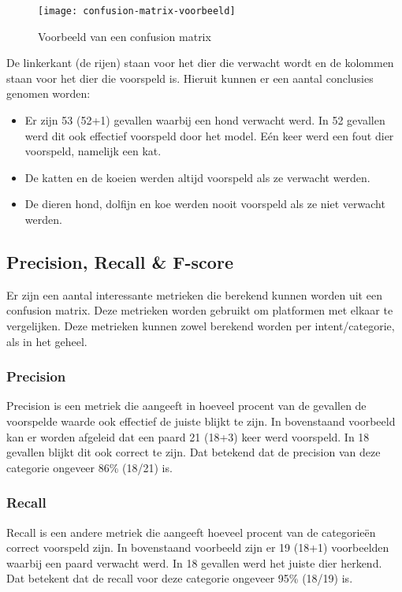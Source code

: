 \begin{figure}[H]
    \label{fig:confusion-matrix-voorbeeld}
    \centering
    \texttt{[image: confusion-matrix-voorbeeld]}
    \caption{Voorbeeld van een confusion matrix}
\end{figure}

De linkerkant (de rijen) staan voor het dier die verwacht wordt en de kolommen staan voor het dier die voorspeld is. Hieruit kunnen er een aantal conclusies genomen worden:
\begin{itemize}
    \item Er zijn 53 (52+1) gevallen waarbij een hond verwacht werd. In 52 gevallen werd dit ook effectief voorspeld door het model. Eén keer werd een fout dier voorspeld, namelijk een kat.
    \item De katten en de koeien werden altijd voorspeld als ze verwacht werden.
    \item De dieren hond, dolfijn en koe werden nooit voorspeld als ze niet verwacht werden.
\end{itemize}

\subsection{Precision, Recall \& F-score}
\label{subsec:validatie-precision-recall-f-score}

Er zijn een aantal interessante metrieken die berekend kunnen worden uit een confusion matrix. Deze metrieken worden gebruikt om platformen met elkaar te vergelijken. Deze metrieken kunnen zowel berekend worden per intent/categorie, als in het geheel.

\subsubsection{Precision}

Precision is een metriek die aangeeft in hoeveel procent van de gevallen de voorspelde waarde ook effectief de juiste blijkt te zijn.
In bovenstaand voorbeeld kan er worden afgeleid dat een paard 21 (18+3) keer werd voorspeld. In 18 gevallen blijkt dit ook correct te zijn. Dat betekend dat de precision van deze categorie ongeveer 86\% (18/21) is. 

\subsubsection{Recall}

Recall is een andere metriek die aangeeft hoeveel procent van de categorieën correct voorspeld zijn. In bovenstaand voorbeeld zijn er 19 (18+1) voorbeelden waarbij een paard verwacht werd. In 18 gevallen werd het juiste dier herkend. Dat betekent dat de recall voor deze categorie ongeveer 95\% (18/19) is.

